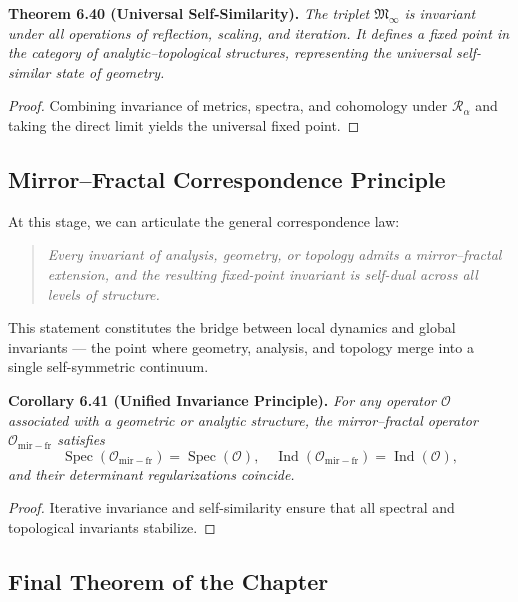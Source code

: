 \noindent
\textbf{Theorem 6.40 (Universal Self-Similarity).}
\emph{The triplet \(\mathfrak{M}_{\infty}\)
is invariant under all operations of reflection,
scaling, and iteration.
It defines a fixed point in the category of analytic–topological structures,
representing the universal self-similar state of geometry.}

\begin{proof}
Combining invariance of metrics, spectra, and cohomology
under \(\mathcal{R}_{\alpha}\)
and taking the direct limit yields the universal fixed point.
\end{proof}

\subsection{Mirror–Fractal Correspondence Principle}\relax \hspace{0pt}

At this stage, we can articulate the general correspondence law:

\begin{quote}
\emph{
Every invariant of analysis, geometry, or topology
admits a mirror–fractal extension,
and the resulting fixed-point invariant
is self-dual across all levels of structure.
}
\end{quote}

This statement constitutes the bridge between local dynamics
and global invariants — the point where
geometry, analysis, and topology merge
into a single self-symmetric continuum.

\noindent
\textbf{Corollary 6.41 (Unified Invariance Principle).}
\emph{For any operator \(\mathcal{O}\)
associated with a geometric or analytic structure,
the mirror–fractal operator
\(\mathcal{O}_{\mathrm{mir-fr}}\)
satisfies
\[
\operatorname{Spec}(\mathcal{O}_{\mathrm{mir-fr}})
=\operatorname{Spec}(\mathcal{O}),
\quad
\operatorname{Ind}(\mathcal{O}_{\mathrm{mir-fr}})
=\operatorname{Ind}(\mathcal{O}),
\]
and their determinant regularizations coincide.}

\begin{proof}
Iterative invariance and self-similarity ensure
that all spectral and topological invariants stabilize.
\end{proof}

\subsection{Final Theorem of the Chapter}\relax \hspace{0pt}

